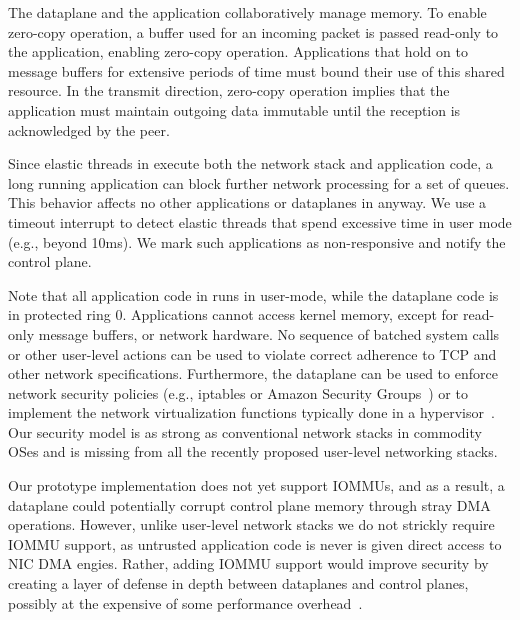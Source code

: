 The \ix dataplane and the application collaboratively manage
memory. To enable zero-copy operation, a buffer used for an incoming
packet is passed read-only to the application, enabling zero-copy
operation. Applications that hold on to message buffers for extensive
periods of time must bound their use of this shared resource.  In the
transmit direction, zero-copy operation implies that the application
must maintain outgoing data immutable until the reception is
acknowledged by the peer. %

Since elastic threads in \ix execute both the network stack and
application code, a long running application can block further network
processing for a set of queues. This behavior affects no other
applications or dataplanes in anyway. We use a timeout interrupt to
detect elastic threads that spend excessive time in user mode (e.g.,
beyond 10ms). We mark such applications as non-responsive and notify
the control plane. %

Note that all application code in \ix runs in user-mode, while the
dataplane code is in protected ring 0. Applications cannot access
kernel memory, except for read-only message buffers, or network
hardware.  No sequence of batched system calls or other user-level
actions can be used to violate correct adherence to TCP and other
network specifications.  Furthermore, the dataplane can be used to
enforce network security policies (e.g., iptables or Amazon Security
Groups~\cite{url:amazon-sg}) or to implement the network virtualization functions typically
done in a hypervisor~\cite{nsdi:nsx}. Our security model is as strong
as conventional network stacks in commodity OSes and is missing from all
the recently proposed user-level networking stacks.

 Our prototype implementation does not yet support IOMMUs, and as a result,
a dataplane could potentially corrupt control plane memory through stray DMA operations.
However, unlike user-level network stacks we do not strickly require IOMMU support, as untrusted
application code is never is given direct access to NIC DMA engies. Rather, adding
IOMMU support would improve security by creating a layer of defense in depth between
dataplanes and control planes, possibly at the expensive of some performance
overhead~\cite{iommu_overhead}.


